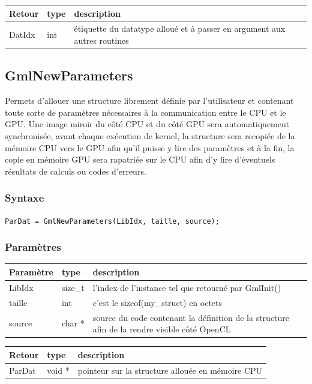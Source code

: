 \documentclass[a4paper,12pt]{article}
\begin{document}
\medskip

\begin{tabular}{|m{2cm}|m{1.5cm}|m{10.5cm}|}
\hline
Retour     & type   & description \\
\hline
DatIdx     & int    & étiquette du datatype alloué et à passer en argument aux autres routines \\
\hline
\end{tabular}


\subsection{GmlNewParameters}

Permets d'allouer une structure librement définie par l'utilisateur et contenant toute sorte de paramètres nécessaires à la communication entre le CPU et le GPU.
Une image miroir du côté CPU et du côté GPU sera automatiquement synchronisée, avant chaque exécution de kernel, la structure sera recopiée de la mémoire CPU vers le GPU afin qu'il puisse y lire des paramètres et à la fin, la copie en mémoire GPU sera rapatriée sur le CPU afin d'y lire d'éventuels résultats de calculs ou codes d'erreurs.

\subsubsection*{Syntaxe}

{\tt ParDat = GmlNewParameters(LibIdx, taille, source);}

\subsubsection*{Paramètres}

\begin{tabular}{|m{2cm}|m{1.5cm}|m{10.5cm}|}
\hline
Paramètre  & type    & description \\
\hline
LibIdx     & size\_t & l'index de l'instance tel que retourné par GmlInit() \\
\hline
taille     & int     & c'est le sizeof(my\_struct) en octets \\
\hline
source     & char *  & source du code contenant la définition de la structure afin de la rendre visible côté OpenCL \\
\hline
\end{tabular}

\medskip

\begin{tabular}{|m{2cm}|m{1.5cm}|m{10.5cm}|}
\hline
Retour     & type   & description \\
\hline
ParDat     & void * & pointeur sur la structure allouée en mémoire CPU \\
\hline
\end{tabular}
\end{document}
